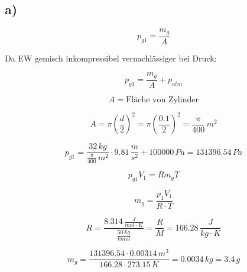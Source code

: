 

\subsection*{a)}

\[
p_{g1} = \frac{m_g}{A}
\]

Da EW gemisch inkompressibel vernachlässiger bei Druck:

\[
p_{g1} = \frac{m_g}{A} + p_{atm}
\]

\[
A = \text{Fläche von Zylinder}
\]

\[
A = \pi \left( \frac{d}{2} \right)^2 = \pi \left( \frac{0.1}{2} \right)^2 = \frac{\pi}{400} \, m^2
\]

\[
p_{g1} = \frac{32 \, kg}{\frac{\pi}{400} \, m^2} \cdot 9.81 \, \frac{m}{s^2} + 100000 \, Pa = 131396.54 \, Pa
\]

\[
p_{g1} V_1 = R m_g T
\]

\[
m_g = \frac{p_1 V_1}{R \cdot T}
\]

\[
R = \frac{8.314 \, \frac{J}{mol \cdot K}}{\frac{50 \, kg}{kmol}} = \frac{R}{M} = 166.28 \, \frac{J}{kg \cdot K}
\]

\[
m_g = \frac{131396.54 \cdot 0.00314 \, m^3}{166.28 \cdot 273.15 \, K} = 0.0034 \, kg = 3.4 \, g
\]